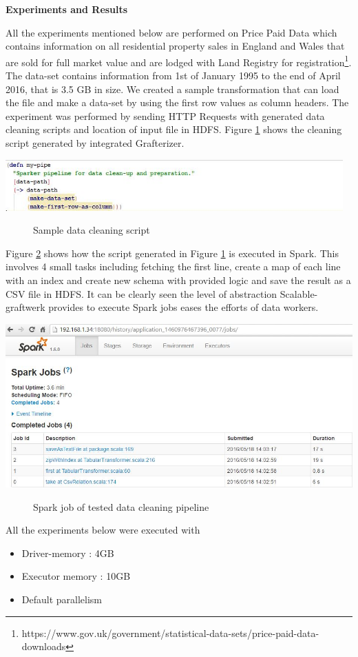 \textbf{Experiments and Results}

All the experiments mentioned below are performed on Price Paid Data which contains information on all residential property sales in England and Wales that are sold for full market value and are lodged with Land Registry for registration\footnote{https://www.gov.uk/government/statistical-data-sets/price-paid-data-downloads}. The data-set contains information from 1st of January 1995 to the end of April 2016, that is 3.5 GB in size. We created a sample transformation that can load the file and make a data-set by using the first row values as column headers. The experiment was performed by sending HTTP Requests with generated data cleaning scripts and location of input file in HDFS. Figure \ref{fig:sample-pipeline} shows the cleaning script generated by integrated Grafterizer. 
\begin{center}
	\includegraphics[width=35em]{./Figures/cluster-pipeline}
	\begin{figure}[htbp]
    \caption{Sample data cleaning script}
    \label{fig:sample-pipeline}
	\end{figure}
\end{center}
 Figure \ref{fig:spark-test-job} shows how the script generated in Figure \ref{fig:sample-pipeline} is executed in Spark. This involves 4 small tasks including fetching the first line, create a map of each line with an index and create new schema with provided logic and save the result as a CSV file in HDFS. It can be clearly seen the level of abstraction Scalable-graftwerk provides to execute Spark jobs eases the efforts of data workers.
\begin{center}
	\includegraphics[width=38em]{./Figures/spark-job}
	\begin{figure}[htbp]
    \caption{Spark job of tested data cleaning pipeline}
    \label{fig:spark-test-job}
	\end{figure}
\end{center}
All the experiments below were executed with 
\begin{itemize}
\item Driver-memory : 4GB
\item Executor memory : 10GB
\item Default parallelism 
\end{itemize}
